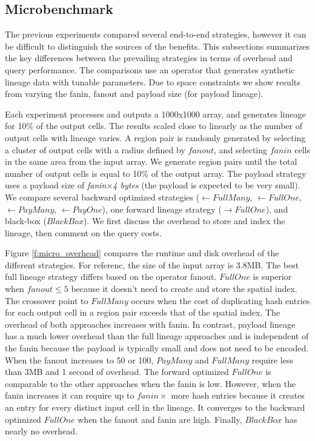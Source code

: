 \subsection{Microbenchmark}


The previous experiments compared several end-to-end strategies, however it can
be difficult to distinguish  the sources of the benefits.  This
subsections summarizes the key differences between the prevailing strategies in
terms of overhead and query performance.  The comparisons use an operator that
generates synthetic lineage data with tunable parameters.  Due to space
constraints we show results from varying the fanin, fanout and payload size
(for payload lineage).



Each experiment processes and outputs a 1000x1000 array, and generates lineage
for 10\% of the output cells.  The results scaled close to linearly as the
number of output cells with lineage varies.   A region pair is
randomly generated by  selecting a cluster of output cells with a radius
defined by $fanout$, and selecting $fanin$  cells in the same area from the
input array.   We generate region pairs until the total number of output cells
is equal to 10\% of the output array.  The payload strategy uses a payload size
of {\it fanin}$\times${\it 4 bytes} (the payload is expected to be very small).
We compare several backward optimized strategies ($\leftarrow FullMany$,
$\leftarrow FullOne$, $\leftarrow PayMany$, $\leftarrow PayOne$), one forward
lineage strategy ($\rightarrow FullOne$), and black-box ($BlackBox$).   We
first discuss the overhead to store and index the lineage, then comment on
the query costs.


Figure \ref{f:micro_overhead} compares the runtime and disk overhead of the
different strategies.  For referenc, the size of the input array is 3.8MB.  The
best full lineage strategy differs based on the operator fanout. $FullOne$ is
superior when $fanout \le 5$ because it doesn't need to create and store the
spatial index.  The crossover point to $FullMany$ occurs when the cost of
duplicating hash entries for each output cell in a region pair exceeds that of
the spatial index.  The overhead of both approaches increases with fanin.  In
contrast, payload lineage has a much lower overhead than the full lineage
approaches and is independent of the fanin because the payload is typically
small and does not need to be encoded.  When the fanout increases to 50 or 100,
$PayMany$ and $FullMany$ require less than 3MB and 1 second of overhead.
 The forward optimized $FullOne$ is comparable to
the other approaches when the fanin is low.   However, when the fanin increases
it can require up to $fanin\times$ more hash entries because it creates an
entry for every distinct input cell in the lineage.  It converges to the
backward optimized $FullOne$ when the fanout and fanin are high. Finally,
$BlackBox$ has nearly no overhead.

